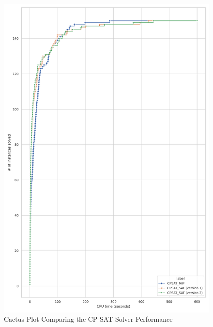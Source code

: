 \begin{figure}[htbp]
\centering
\includegraphics[scale=0.7]{Thesis/figures/minibenchmark_cactus_plot_runtime_CPSAT_with_holes.png}
\caption{Cactus Plot Comparing the CP-SAT Solver Performance}
\label{fig:cactus_CP-SAT}
\end{figure}

